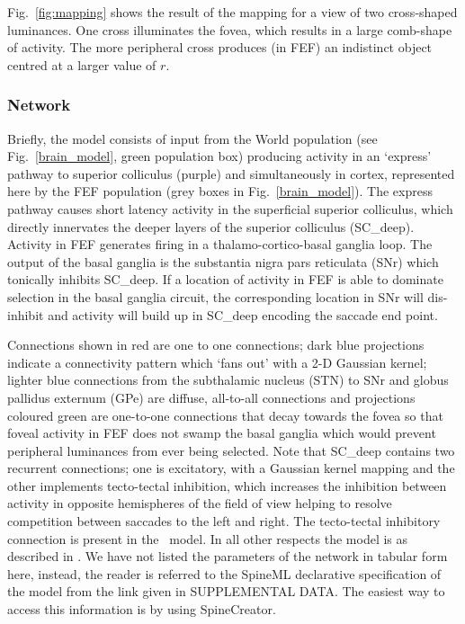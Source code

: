 \documentclass{frontiersSCNS}
\begin{document}
Fig.~\ref{fig:mapping} shows the result of the mapping for a view of
two cross-shaped luminances. One cross illuminates the fovea, which
results in a large comb-shape of activity. The more peripheral cross
produces (in FEF) an indistinct object centred at a larger value of
$r$.

\subsubsection{Network}

Briefly, the model consists of input from the World population (see
Fig.~\ref{brain_model}, green population box) producing activity in an
`express' pathway to superior colliculus (purple) and simultaneously
in cortex, represented here by the FEF population (grey boxes in
Fig.~\ref{brain_model}). The express pathway causes short latency
activity in the superficial superior colliculus, which directly
innervates the deeper layers of the superior colliculus
(SC\_deep). Activity in FEF generates firing in a
thalamo-cortico-basal ganglia loop. The output of the basal ganglia is
the substantia nigra pars reticulata (SNr) which tonically inhibits
SC\_deep. If a location of activity in FEF is able to dominate
selection in the basal ganglia circuit, the corresponding location in
SNr will dis-inhibit and activity will build up in SC\_deep encoding
the saccade end point.

Connections shown in red are one to one connections; dark blue
projections indicate a connectivity pattern which `fans out' with a
2-D Gaussian kernel; lighter blue connections from the subthalamic
nucleus (STN) to SNr and globus pallidus externum (GPe) are diffuse,
all-to-all connections and projections coloured green are one-to-one
connections that decay towards the fovea so that foveal activity in
FEF does not swamp the basal ganglia which would prevent peripheral
luminances from ever being selected.
%
Note that SC\_deep contains two recurrent connections; one is
excitatory, with a Gaussian kernel mapping and the other implements
tecto-tectal inhibition, which increases the inhibition between
activity in opposite hemispheres of the field of
view \citep{gian_g._mascetti_tectotectal_1981,olivier_evidence_2000}
helping to resolve competition between saccades to the left and
right. The tecto-tectal inhibitory connection is  present in
the \ccg~model. In all other respects the model is as described in
\cite{cope_basal_2017}.
%
We have not listed the parameters of the network in tabular form here,
instead, the reader is referred to the SpineML declarative
specification of the model from the link given in SUPPLEMENTAL DATA.
The easiest way to access this information is by using SpineCreator.
\end{document}
